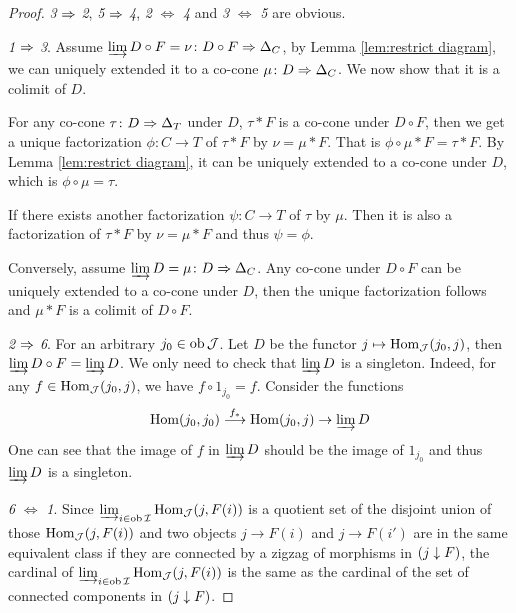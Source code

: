 \begin{proof}
  \emph{3} $\Rightarrow$ \emph{2}, \emph{5} $\Rightarrow$ \emph{4}, \emph{2} $\Leftrightarrow$ \emph{4} and \emph{3} $\Leftrightarrow$ \emph{5} are obvious.


  \emph{1} $\Rightarrow$ \emph{3}. Assume $\operatorname*{\underrightarrow{\lim}} D\circ F = \nu\colon D\circ F\Rightarrow \Delta_C$, by Lemma \ref{lem:restrict diagram}, we can uniquely extended it to a co-cone $\mu\colon D\Rightarrow\Delta_C$. We now show that it is a colimit of $D$.

  For any co-cone $\tau\colon D\Rightarrow\Delta_T$ under $D$, $\tau\ast F$ is a co-cone under $D\circ F$,  then we get a unique factorization $\phi\colon C\to T$ of $\tau\ast F$ by $\nu=\mu\ast F$. That is $\phi\circ\mu\ast F=\tau\ast F$. By  Lemma \ref{lem:restrict diagram}, it can be uniquely extended to a co-cone under $D$, which is $\phi\circ\mu = \tau$.

  If there exists another factorization $\psi\colon C\to T$ of $\tau$ by $\mu$. Then it is also a factorization of $\tau\ast F$ by $\nu=\mu\ast F$ and thus $\psi=\phi$.

  Conversely, assume $\operatorname*{\underrightarrow{\lim}} D = \mu\colon D\Rightarrow \Delta_C$. Any co-cone under $D\circ F$ can be uniquely extended to a co-cone under $D$, then the unique factorization follows and $\mu\ast F$ is a colimit of $D\circ F$.

  \emph{2} $\Rightarrow$ \emph{6}. For an arbitrary $j_0\in\operatorname{ob}{\cal J}$. Let $D$ be the functor $j\mapsto\operatorname{Hom}_{{\cal J}}(j_0,j)$, then
  $\operatorname*{\underrightarrow{\lim}} D\circ F = \operatorname*{\underrightarrow{\lim}} D$. We only need to check that $\operatorname*{\underrightarrow{\lim}} D$ is a singleton. Indeed, for any $f\in\operatorname{Hom}_{{\cal J}}(j_0,j)$, we have $f\circ 1_{j_0} = f$. Consider the functions
  \begin{equation*}
    \operatorname{Hom}(j_0,j_0)\stackrel{{f_{\ast}}}{\longrightarrow}\operatorname{Hom}(j_0,j)\to\operatorname*{\underrightarrow{\lim}} D
  \end{equation*}
  One can see that the image of $f$ in $\operatorname*{\underrightarrow{\lim}} D$ should be the image of $1_{j_0}$ and thus $\operatorname*{\underrightarrow{\lim}} D$ is a singleton.

  \emph{6} $\Leftrightarrow$ \emph{1}. Since $\operatorname*{\underrightarrow{\lim}}_{i\in\operatorname{ob}{\cal I}} \operatorname{Hom}_{{\cal J}}(j,F(i))$ is a quotient set of the disjoint union of those $\operatorname{Hom}_{{\cal J}}(j,F(i))$ and two objects $j\to F(i)$ and $j\to F(i')$ are in the same equivalent class if they are connected by a zigzag of morphisms in $(j\downarrow F)$, the cardinal of $\operatorname*{\underrightarrow{\lim}}_{i\in\operatorname{ob}{\cal I}} \operatorname{Hom}_{{\cal J}}(j,F(i))$ is the same as the cardinal of the set of connected components in $(j\downarrow F)$.
\end{proof}

